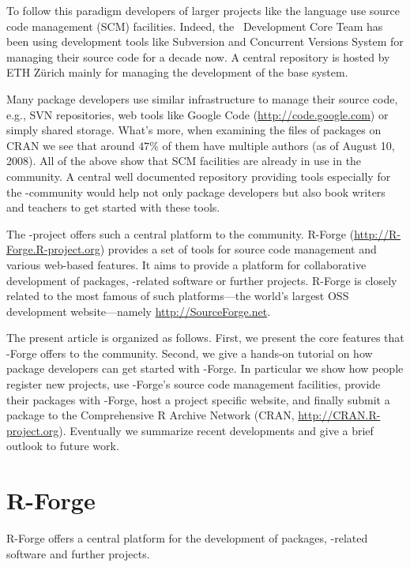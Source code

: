 To follow this paradigm developers of larger projects like the
language \R{} use source code management (SCM) facilities. Indeed, the
\R{}~Development Core Team has been using 
development tools like Subversion \citep[SVN,
see][]{forge:Pilato+Collins-Sussman+Fitzpatrick:2004} and Concurrent
Versions System \citep[CVS, see][]{forge:Cederqvist:2006} 
for managing their source code for a decade now.  
A central repository is hosted by ETH Z\"urich mainly for
managing the development of the base \R{} system. 

Many package developers use similar infrastructure to manage their
source code, e.g., SVN repositories, web tools like Google Code
(\url{http://code.google.com}) or simply shared storage. What's more,
when examining the 
 files of 
packages on CRAN we see that around $47\%$ of them have multiple
authors (as of August 10, 2008). All of the above show that SCM
facilities are already in use in the \R{} community. A central
well documented repository providing tools especially for the
\R{}-community would help not only package developers but also book
writers and teachers to get started with these tools.

The \R{}-project offers such a central platform to the \R{}
community. R-Forge (\url{http://R-Forge.R-project.org}) provides a set
of tools for source code management and various web-based
features. It aims to provide a platform for collaborative development of
\R{} packages, \R{}-related software or further projects. R-Forge is
closely related to the most famous of such platforms---the 
world's largest OSS development website---namely
\url{http://SourceForge.net}.

The present article is organized as follows. First, we present the core
features that \R{}-Forge offers to the \R{} community. Second, we
give a hands-on tutorial on how package developers can get started with 
\R{}-Forge. In particular we show how people register new projects,
use \R{}-Forge's source code management facilities, provide their 
packages with \R{}-Forge, host a project specific website, and
finally submit a package to the Comprehensive R Archive Network (CRAN,
\url{http://CRAN.R-project.org}).
Eventually we summarize recent developments and give a brief outlook
to future work.

\section{R-Forge}
R-Forge offers a central platform for the development of \R{}
packages, \R{}-related software and further projects. 


